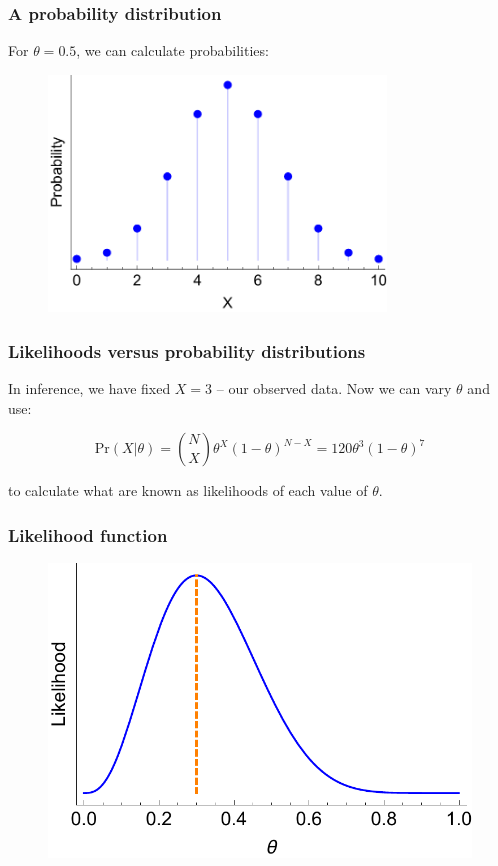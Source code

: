 \documentclass[handout]{beamer}
\begin{document}
\begin{frame}
	\frametitle{A probability distribution}
	For $\theta=0.5$, we can calculate probabilities:
	
	\begin{figure}[h]
		\centerline{\includegraphics[width=0.8\textwidth]{animations_figures/binomial.pdf}}
	\end{figure}

\end{frame}

\begin{frame}
	\frametitle{Likelihoods versus probability distributions}
	In inference, we have fixed $X=3$ -- our observed data. Now we can vary $\theta$ and use:
	
		\begin{equation}
		\text{Pr}(X|\theta) = \binom{N}{X} \theta^X (1- \theta)^{N-X} = 120 \theta^3 (1-\theta)^7
		\end{equation}
		
	to calculate what are known as likelihoods of each value of $\theta$.
	
\end{frame}

\begin{frame}
	\frametitle{Likelihood function}
	
	\begin{figure}[h]
		\centerline{\includegraphics[width=1\textwidth]{animations_figures/binomial_likelihood_eg.pdf}}
	\end{figure}
	
\end{frame}
\end{document}
